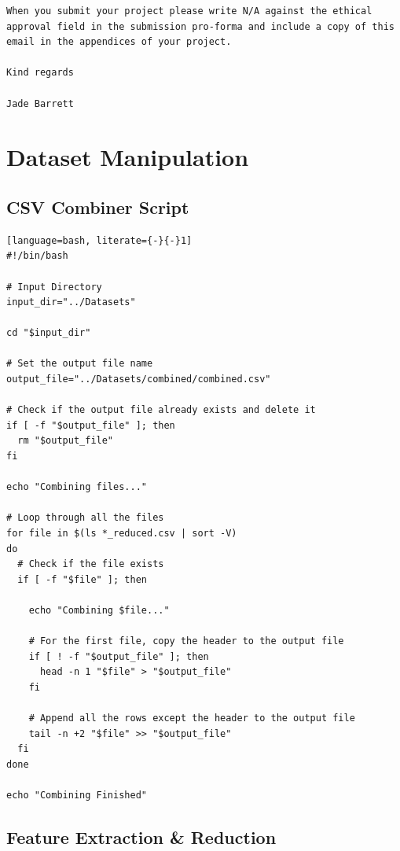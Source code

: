 \begin{appendices}
\begin{lstlisting}[language={}]
When you submit your project please write N/A against the ethical approval field in the submission pro-forma and include a copy of this email in the appendices of your project.

Kind regards

Jade Barrett
\end{lstlisting}

\section{Dataset Manipulation}

\subsection{CSV Combiner Script}
\label{appx: CSV Combiner Script}
\begin{lstlisting}[language=bash, literate={-}{-}1]
#!/bin/bash

# Input Directory
input_dir="../Datasets"

cd "$input_dir"

# Set the output file name
output_file="../Datasets/combined/combined.csv"

# Check if the output file already exists and delete it
if [ -f "$output_file" ]; then
  rm "$output_file"
fi

echo "Combining files..."

# Loop through all the files
for file in $(ls *_reduced.csv | sort -V)
do
  # Check if the file exists
  if [ -f "$file" ]; then

    echo "Combining $file..."

    # For the first file, copy the header to the output file
    if [ ! -f "$output_file" ]; then
      head -n 1 "$file" > "$output_file"
    fi

    # Append all the rows except the header to the output file
    tail -n +2 "$file" >> "$output_file"
  fi
done

echo "Combining Finished"
\end{lstlisting}

\newpage
\subsection{Feature Extraction \& Reduction}
\label{appx: Feature Extraction}


\end{appendices}
